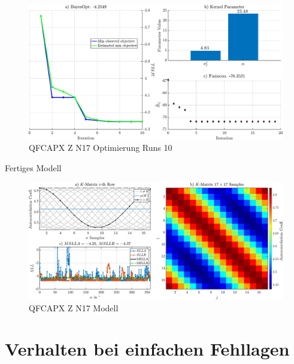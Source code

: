 \begin{figure}[tbph]
	\centering
	\includegraphics[width=\linewidth]{appendix/images/8-Ergebnisse-Experimente/QFCAPX-Z-N17-Opt}
	\caption[QFCAPX Z N17 Optimierung Runs 10]{QFCAPX Z N17 Optimierung Runs 10}
	\label{fig:qfcapx-z-n17-opt}
\end{figure}



Fertiges Modell


\begin{figure}[tbph]
	\centering
	\includegraphics[width=\linewidth]{appendix/images/8-Ergebnisse-Experimente/QFCAPX-Z-N17-Model}
	\caption[QFCAPX Z N17 Modell]{QFCAPX Z N17 Modell}
	\label{fig:qfcapx-z-n17-model}
\end{figure}


\clearpage


\section{Verhalten bei einfachen Fehllagen}\label{sec:ergexp5}


